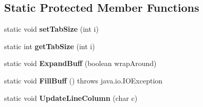 \subsection*{Static Protected Member Functions}
\begin{DoxyCompactItemize}
\item 
static void {\bfseries set\+Tab\+Size} (int i)\hypertarget{classpack_1_1_simple_char_stream_ad944d3a7ad2c7e1428ff72bbc4ebbaf5}{}\label{classpack_1_1_simple_char_stream_ad944d3a7ad2c7e1428ff72bbc4ebbaf5}

\item 
static int {\bfseries get\+Tab\+Size} (int i)\hypertarget{classpack_1_1_simple_char_stream_afb5b6fc4e74f330f805d7d9f3d2e79dc}{}\label{classpack_1_1_simple_char_stream_afb5b6fc4e74f330f805d7d9f3d2e79dc}

\item 
static void {\bfseries Expand\+Buff} (boolean wrap\+Around)\hypertarget{classpack_1_1_simple_char_stream_a114f8e0e94e8b9a6b6f670aef0635756}{}\label{classpack_1_1_simple_char_stream_a114f8e0e94e8b9a6b6f670aef0635756}

\item 
static void {\bfseries Fill\+Buff} ()  throws java.\+io.\+I\+O\+Exception   \hypertarget{classpack_1_1_simple_char_stream_a14fd137942b416f70e3e07fe103520c9}{}\label{classpack_1_1_simple_char_stream_a14fd137942b416f70e3e07fe103520c9}

\item 
static void {\bfseries Update\+Line\+Column} (char c)\hypertarget{classpack_1_1_simple_char_stream_a46749e2697ff57f3babec038bd7ace57}{}\label{classpack_1_1_simple_char_stream_a46749e2697ff57f3babec038bd7ace57}

\end{DoxyCompactItemize}
